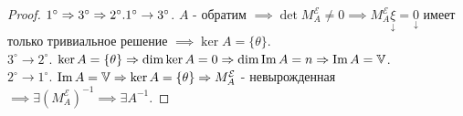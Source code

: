 \documentclass[../main.tex]{subfiles}
\begin{document}
\begin{proof}
    $1^{\circ}\implies 3^{\circ}\implies 2^{\circ}.\\ 1^{\circ}\to 3^{\circ}$. $A$ - обратим $\implies \det{M_{A}^{\mathcal{E}}}\neq 0\implies M_{A}^{\mathcal{E}}\underset{\downarrow}{\xi}=\underset{\downarrow}{0}$ имеет только тривиальное решение $\implies \ker{A} = \{\theta\}$.
\\$3^{\circ}\to 2^{\circ}$. $\ker{A} = \{\theta\} \implies \dim{\ker{A}} = 0 \implies \dim{\Im A} = n \implies \Im A = \V$. \\ 
$2^{\circ}\to 1^{\circ}$. $\Im A = \V \implies \ker{A} = \{\theta\} \implies M_{A}^{\mathcal{E}}$ - невырожденная $\implies \exists (M_{A}^{\mathcal{E}})^{-1}\implies \exists A^{-1}$.

\end{proof}
\end{document}

